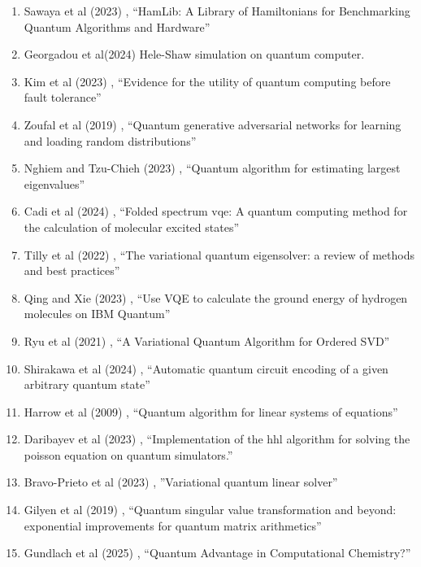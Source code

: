 \documentclass[a4paper,fleqn]{cas-sc}
\begin{document}
\begin{enumerate}
''Variational quantum eigensolvers in the era of distributed quantum computers''
\item Sawaya et al (2023) \cite{10313872},
  ``HamLib: A Library of Hamiltonians for Benchmarking Quantum Algorithms and Hardware''
\item Georgadou et al(2024) \cite{gopalakrishnan2024solving}
	Hele-Shaw simulation on quantum computer.
\item Kim et al (2023) \cite{kim2023evidence}, ``Evidence for the utility of quantum computing before fault tolerance''
\item Zoufal et al (2019) \cite{zoufal2019quantum}, ``Quantum generative adversarial networks for learning and loading random distributions''
\item Nghiem and Tzu-Chieh (2023) \cite{nghiem2023quantum}, ``Quantum algorithm for estimating largest eigenvalues''
\item Cadi et al (2024) \cite{cadi2024folded}, ``Folded spectrum vqe: A quantum computing method for the calculation of molecular excited states''
\item Tilly et al (2022) \cite{tilly2022variational}, ``The variational quantum eigensolver: a review of methods and best practices''
\item Qing and Xie (2023) \cite{qing2023usevqecalculateground}, ``Use VQE to calculate the ground energy of hydrogen molecules on IBM Quantum''
\item Ryu et al (2021) \cite{VQSVD}, ``A Variational Quantum Algorithm for Ordered SVD''
\item Shirakawa et al (2024) \cite{PhysRevResearch.6.043008}, ``Automatic quantum circuit encoding of a given arbitrary quantum state''
\item Harrow et al (2009) \cite{harrow2009quantum}, ``Quantum algorithm for linear systems of equations''
\item Daribayev et al (2023) \cite{daribayev2023implementation}, 
  ``Implementation of the hhl algorithm for solving the poisson equation on quantum simulators.''
\item Bravo-Prieto et al (2023) \cite{bravo2023variational},
  ''Variational quantum linear solver''
\item Gilyen et al (2019) \cite{gilyen2019quantum},
  ``Quantum singular value transformation and beyond: exponential improvements for quantum matrix arithmetics''
\item Gundlach et al (2025) \cite{gundlach2025quantumadvantagecomputationalchemistry}, ``Quantum Advantage in Computational Chemistry?''

\end{enumerate}
\end{document}
